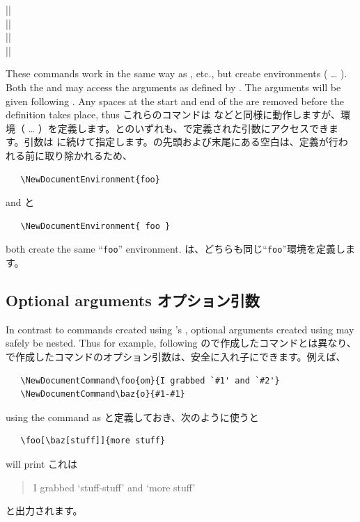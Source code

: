 \documentclass{ltxguide}
\newcommand\jpnewline{\vspace{3pt}\newline}
\begin{document}
\begin{decl}
  |\NewDocumentEnvironment|         \\
  |\RenewDocumentEnvironment|       \\
  |\ProvideDocumentEnvironment|     \\
  |\DeclareDocumentEnvironment|    
\end{decl}
These commands work in the same way as , etc.\@, but
create environments ( \ldots{}
). Both the  and 
may access the arguments as defined by . The arguments will be
given following . Any spaces at the start and end of the
 are removed before the definition takes place, thus
\jpnewline
これらのコマンドは などと同様に動作しますが、環境（ \ldots{} ）を定義します。とのいずれも、で定義された引数にアクセスできます。引数は に続けて指定します。の先頭および末尾にある空白は、定義が行われる前に取り除かれるため、
\begin{verbatim}
   \NewDocumentEnvironment{foo}
\end{verbatim}
and
\jpnewline
と
\begin{verbatim}
   \NewDocumentEnvironment{ foo }
\end{verbatim}
both create the same \enquote{\texttt{foo}} environment.
\jpnewline
は、どちらも同じ\enquote{\texttt{foo}}環境を定義します。


\subsection{Optional arguments
オプション引数}
\label{sec:cmd:opt}
\label{sec:cmd:opt}

In contrast to commands created using \LaTeXe{}'s , optional
arguments created using  may safely be nested. Thus for
example, following
\jpnewline
\LaTeXe{}ので作成したコマンドとは異なり、で作成したコマンドのオプション引数は、安全に入れ子にできます。例えば、
\begin{verbatim}
   \NewDocumentCommand\foo{om}{I grabbed `#1' and `#2'}
   \NewDocumentCommand\baz{o}{#1-#1}
\end{verbatim}
using the command as
\jpnewline
と定義しておき、次のように使うと
\begin{verbatim}
   \foo[\baz[stuff]]{more stuff}
\end{verbatim}
will print
\jpnewline
これは
\begin{quote}
I grabbed `stuff-stuff' and `more stuff'
\end{quote}
と出力されます。
\end{document}

